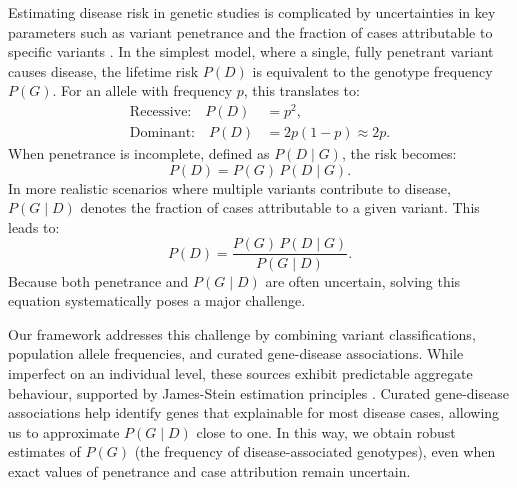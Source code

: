 Estimating disease risk in genetic studies is complicated by uncertainties in key parameters such as variant penetrance and the fraction of cases attributable to specific variants \cite{zschocke_mendelian_2023}. 
In the simplest model, where a single, fully penetrant variant causes disease, the lifetime risk \(P(D)\) is equivalent to the genotype frequency \(P(G)\). 
For an allele with frequency \(p\), this translates to:
\[
\begin{aligned}
\text{Recessive:} \quad P(D) &= p^2, \\
\text{Dominant:} \quad P(D) &= 2p(1-p) \approx 2p.
\end{aligned}
\]
When penetrance is incomplete, defined as \(P(D\mid G)\), the risk becomes:
\[
P(D) = P(G)\,P(D\mid G).
\]
In more realistic scenarios where multiple variants contribute to disease, \(P(G\mid D)\) denotes the fraction of cases attributable to a given variant. This leads to:
\[
P(D) = \frac{P(G)\,P(D\mid G)}{P(G\mid D)}.
\]
Because both penetrance and \(P(G\mid D)\) are often uncertain, solving this equation systematically poses a major challenge.

Our framework addresses this challenge by combining variant classifications, population allele frequencies, and curated gene-disease associations. 
While imperfect on an individual level, these sources exhibit predictable aggregate behaviour, supported by James-Stein estimation principles \cite{efron_steins_1973}.
Curated gene-disease associations help identify genes that explainable for most disease cases, allowing us to approximate \(P(G\mid D)\) close to one. In this way, we obtain robust estimates of \(P(G)\) (the frequency of disease-associated genotypes), even when exact values of penetrance and case attribution remain uncertain.

